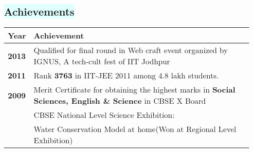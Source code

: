 \documentclass[a4paper,10pt]{extarticle}
\begin{document}
\begin{mybox}
\subsection*{\colorbox{LightCyan}{\setmainfont{Calibri Bold.ttf}\textbf{Achievements}}}
\begin{tabular}[H]{|>{\centering\arraybackslash}p{3cm}|p{14.5cm}|}
\hline
\setmainfont{Calibri Bold.ttf}\textbf{Year} &	\setmainfont{Calibri Bold.ttf}Achievement \\ \hline
\setmainfont{Calibri Bold.ttf}\textbf{2013} &	Qualified for final round in Web craft event organized by IGNUS, A tech-cult fest of IIT Jodhpur \\ \hline
\setmainfont{Calibri Bold.ttf}\textbf{2011} &	Rank {\setmainfont{Calibri Bold.ttf}\textbf{3763}} in IIT-JEE 2011 among 4.8 lakh students. \\ \hline
\setmainfont{Calibri Bold.ttf}\textbf{2009} &	Merit Certificate for obtaining the highest marks in {\setmainfont{Calibri Bold.ttf}\textbf{Social Sciences, English \& Science}} in CBSE X Board \\ \hline
\multirow{2}{*}{\setmainfont{Calibri Bold.ttf}\textbf{2009}} &	\multirow{1}{*}{CBSE National Level Science Exhibition:}\\  & \multirow{1}{*}{Water Conservation Model at home(Won at Regional Level Exhibition)} \\ \hline

\end{tabular}


\end{mybox}
\end{document}
